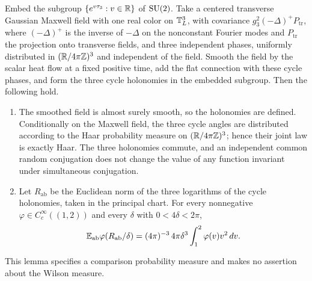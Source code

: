 \begin{lemma}\label{ch27:lem:abelian-reference}
Embed the subgroup $\{e^{v\tau_3}:v\in\mathbb R\}$ of $\mathrm{SU}(2)$. Take a centered transverse Gaussian Maxwell field with one real color on $\mathbb T_L^3$, with covariance $g_3^2(-\Delta)^+P_{\mathrm{tr}}$, where $(-\Delta)^+$ is the inverse of $-\Delta$ on the nonconstant Fourier modes and $P_{\mathrm{tr}}$ the projection onto transverse fields, and three independent phases, uniformly distributed in $(\mathbb R/4\pi\mathbb Z)^3$ and independent of the field. Smooth the field by the scalar heat flow at a fixed positive time, add the flat connection with these cycle phases, and form the three cycle holonomies in the embedded subgroup. Then the following hold.
\begin{enumerate}
\item The smoothed field is almost surely smooth, so the holonomies are defined. Conditionally on the Maxwell field, the three cycle angles are distributed according to the Haar probability measure on $(\mathbb R/4\pi\mathbb Z)^3$; hence their joint law is exactly Haar. The three holonomies commute, and an independent common random conjugation does not change the value of any function invariant under simultaneous conjugation.
\item Let $R_{\mathrm{ab}}$ be the Euclidean norm of the three logarithms of the cycle holonomies, taken in the principal chart. For every nonnegative $\varphi\in C_c^\infty((1,2))$ and every $\delta$ with $0<4\delta<2\pi$,
\[
 \mathbb E_{\mathrm{ab}}\varphi(R_{\mathrm{ab}}/\delta)=(4\pi)^{-3}\,4\pi\delta^3\int_1^2\varphi(v)v^2\,dv.
\]
\end{enumerate}
This lemma specifies a comparison probability measure and makes no assertion about the Wilson measure.
\end{lemma}

